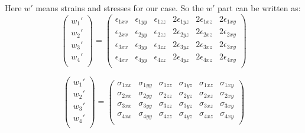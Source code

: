 Here $w'$ means strains and stresses for our case. So the $w'$ part can be written as:
\begin{equation}
\begin{pmatrix}
{w_1}' \\
{w_2}' \\
{w_3}' \\
{w_4}' \\
\end{pmatrix} = \begin{pmatrix}
\epsilon_{1xx} & \epsilon_{1yy} & \epsilon_{1zz} & 2\epsilon_{1yz} & 2\epsilon_{1xz} & 2\epsilon_{1xy}   \\
\epsilon_{2xx} & \epsilon_{2yy} & \epsilon_{2zz} & 2\epsilon_{2yz} & 2\epsilon_{2xz} & 2\epsilon_{2xy}   \\
\epsilon_{3xx} & \epsilon_{3yy} & \epsilon_{3zz} & 2\epsilon_{3yz} & 2\epsilon_{3xz} & 2\epsilon_{3xy}   \\
\epsilon_{4xx} & \epsilon_{4yy} & \epsilon_{4zz} & 2\epsilon_{4yz} & 2\epsilon_{4xz} & 2\epsilon_{4xy}   \\
\end{pmatrix}
\end{equation}

\begin{equation}
\begin{pmatrix}
{w_1}' \\
{w_2}' \\
{w_3}' \\
{w_4}' \\
\end{pmatrix} = \begin{pmatrix}
\sigma_{1xx} & \sigma_{1yy} & \sigma_{1zz} & \sigma_{1yz} & \sigma_{1xz} & \sigma_{1xy}   \\
\sigma_{2xx} & \sigma_{2yy} & \sigma_{2zz} & \sigma_{2yz} & \sigma_{2xz} & \sigma_{2xy} \\
\sigma_{3xx} & \sigma_{3yy} & \sigma_{3zz} & \sigma_{3yz} & \sigma_{3xz} & \sigma_{3xy} \\
\sigma_{4xx} & \sigma_{4yy} & \sigma_{4zz} & \sigma_{4yz} & \sigma_{4xz} & \sigma_{4xy}  \\
\end{pmatrix}
\end{equation}

